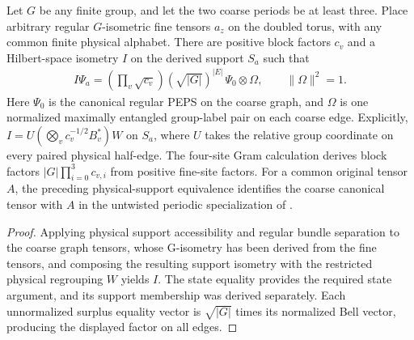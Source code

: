 \begin{lemma}%
    \label{thm:peps_two_by_two_physical_renormalization}
    \leanok
    Let $G$ be any finite group, and let the two coarse periods be at least
    three. Place arbitrary regular $G$-isometric fine tensors $a_z$ on the
    doubled torus, with any common finite physical alphabet. There are
    positive block factors $c_v$ and a Hilbert-space isometry $I$ on the
    derived support $S_a$ such that
    \begin{align}
        I\Psi_a=
        \left(\prod_v\sqrt{c_v}\right)
        (\sqrt{|G|})^{|E|}\,\Psi_0\otimes\Omega,
        \qquad \|\Omega\|^2=1.
    \end{align}
    Here $\Psi_0$ is the canonical regular PEPS on the coarse
    graph, and $\Omega$ is one normalized maximally entangled group-label
    pair on each coarse edge. Explicitly,
    $I=U(\bigotimes_vc_v^{-1/2}B_v^*)W$ on $S_a$, where $U$ takes the
    relative group coordinate on every paired physical half-edge.
    The four-site Gram calculation derives block factors
    $|G|\prod_{i=0}^3c_{v,i}$ from positive fine-site factors.
    For a common original tensor $A$, the preceding physical-support
    equivalence identifies the coarse canonical tensor with $A$ in the
    untwisted periodic specialization of
    \cite[Observations~6.5--6.6]{Schuch2010PEPS}.
\end{lemma}

\begin{proof}\leanok
    Applying physical support accessibility and regular bundle separation to
    the coarse graph tensors, whose G-isometry has been derived
    from the fine tensors, and composing the resulting support isometry with
    the restricted physical regrouping $W$ yields $I$. The state equality
    provides the required state argument, and its support membership was
    derived separately.
    Each unnormalized surplus equality vector is $\sqrt{|G|}$ times its
    normalized Bell vector, producing the displayed factor on all edges.
\end{proof}
